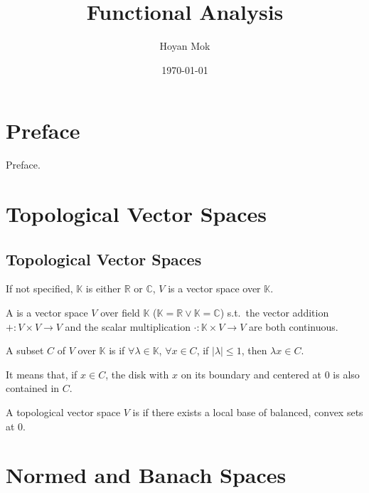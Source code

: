 \documentclass[openany, a5paper]{book}
\title{Functional Analysis}
\author{Hoyan Mok}
\date{\today} %
\begin{document}
\maketitle %
\frontmatter
\chapter{Preface}
Preface.

\tableofcontents

\mainmatter
\chapter{Topological Vector Spaces}

\section{Topological Vector Spaces}

If not specified, $\mathbb K$ is either $\mathbb R$ or $\mathbb C$, $V$ is a vector space over $\mathbb K$.

\begin{definition}%
	\label{def: topological vector space}
	A  is a vector space $V$ over field $\mathbb K$ ($\mathbb K = \mathbb R \vee \mathbb K = \mathbb C$) s.t.\ 
	the vector addition $+\colon V \times V \to V$ and the scalar multiplication $\cdot \colon \mathbb K \times V \to V$ are both continuous.
\end{definition}


\begin{definition}%
	\label{def: balanced set}
	A subset $C$ of  $V$ over $\mathbb K$ is  if $\forall \lambda \in \mathbb K$,  $\forall x \in C$, if $|\lambda| \leq 1$, then $\lambda x \in C$.
\end{definition}
It means that, if $x \in C$, the disk with $x$ on its boundary and centered at $0$ is also contained in $C$.


\begin{definition}%
	\label{def: locally convexity}
	A topological vector space $V$ is  if there exists a local base of balanced, convex sets at $0$.
\end{definition}


\chapter{Normed and Banach Spaces}
\end{document}
